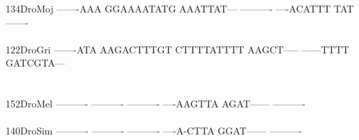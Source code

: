 \documentclass[11pt,twoside,reqno,a4paper]{article}
\begin{document}
{134\hspace*{2\charwidth}DroMoj	-------AAA	GGAAAATATG	AAATTAT---	----------	----ACATTT	TAT-------	\\
\hspace*{5\charwidth}\hspace*{7\charwidth}\hspace*{1\charwidth}\hspace*{1\charwidth}\hspace*{1\charwidth}\hspace*{1\charwidth}\hspace*{1\charwidth}\hspace*{1\charwidth}\\
122\hspace*{2\charwidth}DroGri	-------ATA	AAGACTTTGT	CTTTTATTTT	AAGCT-----	------TTTT	GATCGTA---	\\
\hspace*{5\charwidth}\hspace*{7\charwidth}\hspace*{1\charwidth}\hspace*{1\charwidth}\hspace*{1\charwidth}\hspace*{1\charwidth}\hspace*{1\charwidth}\hspace*{1\charwidth}\\
\\
152\hspace*{2\charwidth}DroMel	----------	----------	----------	----AAGTTA	AGAT------	----------	\\
\hspace*{5\charwidth}\hspace*{7\charwidth}\hspace*{1\charwidth}\hspace*{1\charwidth}\hspace*{1\charwidth}\hspace*{1\charwidth}\hspace*{1\charwidth}\hspace*{1\charwidth}\\
140\hspace*{2\charwidth}DroSim	----------	----------	----------	----A-CTTA	GGAT------	----------	\\
\hspace*{5\charwidth}\hspace*{7\charwidth}\hspace*{1\charwidth}\hspace*{1\charwidth}\hspace*{1\charwidth}\hspace*{1\charwidth}\hspace*{1\charwidth}\hspace*{1\charwidth}\\
}
\end{document}
